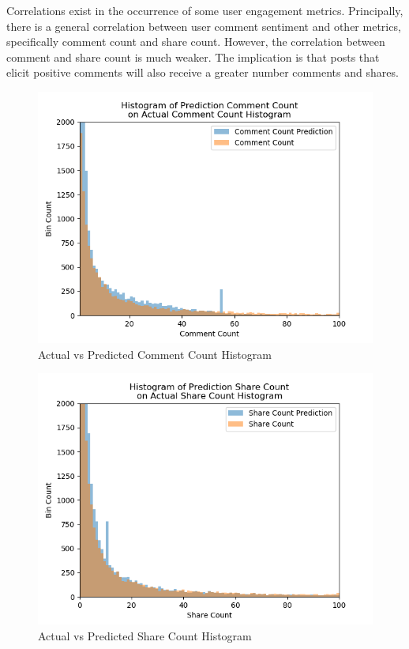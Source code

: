 \documentclass[mksc,blindrev]{informs3} %
\begin{document}
Correlations exist in the occurrence of some user engagement metrics. Principally, there is a general correlation between user comment sentiment and other metrics, specifically comment count and share count. However, the correlation between comment and share count is much weaker. The implication is that posts that elicit positive comments will also receive a greater number comments and shares. 


\begin{figure}
\centering
\includegraphics[width=\columnwidth]{images/Comment_Count_Prediction_vs_Actual.png}
\caption{Actual vs Predicted Comment Count Histogram}
\label{comment_count_histogram}
\end{figure}

\begin{figure}
\centering
\includegraphics[width=\columnwidth]{images/Share_Count_Prediction_vs_Actual.png}
\caption{Actual vs Predicted Share Count Histogram}
\label{share_count_histogram}
\end{figure}
\end{document}

